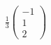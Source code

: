 \documentclass[preview]{standalone}
\begin{document}
\begin{align*}
\frac{1}{3} \begin{pmatrix} -1 \\ 1 \\ 2 \end{pmatrix}
\end{align*}
\end{document}
